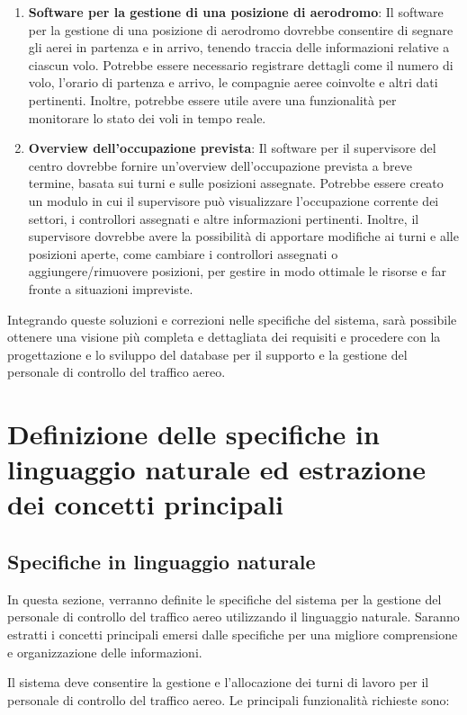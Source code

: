 \begin{enumerate}
\item \textbf{Software per la gestione di una posizione di aerodromo}: Il software per la gestione di una posizione di aerodromo dovrebbe consentire di segnare gli aerei in partenza e in arrivo, tenendo traccia delle informazioni relative a ciascun volo. Potrebbe essere necessario registrare dettagli come il numero di volo, l'orario di partenza e arrivo, le compagnie aeree coinvolte e altri dati pertinenti. Inoltre, potrebbe essere utile avere una funzionalità per monitorare lo stato dei voli in tempo reale.

\item \textbf{Overview dell'occupazione prevista}: Il software per il supervisore del centro dovrebbe fornire un'overview dell'occupazione prevista a breve termine, basata sui turni e sulle posizioni assegnate. Potrebbe essere creato un modulo in cui il supervisore può visualizzare l'occupazione corrente dei settori, i controllori assegnati e altre informazioni pertinenti. Inoltre, il supervisore dovrebbe avere la possibilità di apportare modifiche ai turni e alle posizioni aperte, come cambiare i controllori assegnati o aggiungere/rimuovere posizioni, per gestire in modo ottimale le risorse e far fronte a situazioni impreviste.
\end{enumerate}

Integrando queste soluzioni e correzioni nelle specifiche del sistema, sarà possibile ottenere una visione più completa e dettagliata dei requisiti e procedere con la progettazione e lo sviluppo del database per il supporto e la gestione del personale di controllo del traffico aereo.

\pagebreak

\section{Definizione delle specifiche in linguaggio naturale ed estrazione dei concetti principali}
\subsection{Specifiche in linguaggio naturale}
In questa sezione, verranno definite le specifiche del sistema per la gestione del personale di controllo del traffico aereo utilizzando il linguaggio naturale. Saranno estratti i concetti principali emersi dalle specifiche per una migliore comprensione e organizzazione delle informazioni.

Il sistema deve consentire la gestione e l'allocazione dei turni di lavoro per il personale di controllo del traffico aereo. Le principali funzionalità richieste sono:

